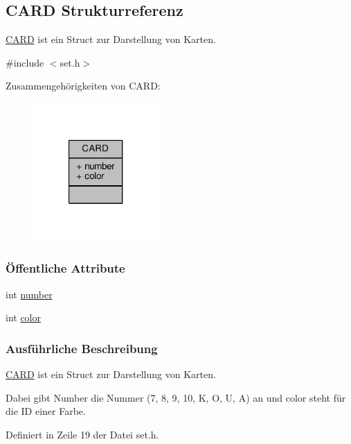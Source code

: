 \hypertarget{struct_c_a_r_d}{\subsection{C\-A\-R\-D Strukturreferenz}
\label{struct_c_a_r_d}
}


\hyperlink{struct_c_a_r_d}{C\-A\-R\-D} ist ein Struct zur Darstellung von Karten.  




{\ttfamily \#include $<$set.\-h$>$}



Zusammengehörigkeiten von C\-A\-R\-D\-:\nopagebreak
\begin{figure}[H]
\begin{center}
\leavevmode
\includegraphics[width=136pt]{d8/ded/struct_c_a_r_d__coll__graph}
\end{center}
\end{figure}
\subsubsection*{Öffentliche Attribute}
\begin{DoxyCompactItemize}
\item 
int \hyperlink{struct_c_a_r_d_a36f0e6c29177b3e38a73a17c57d2f0ac}{number}
\item 
int \hyperlink{struct_c_a_r_d_a931664b6380e876a72b664225ddfe20d}{color}
\end{DoxyCompactItemize}


\subsubsection{Ausführliche Beschreibung}
\hyperlink{struct_c_a_r_d}{C\-A\-R\-D} ist ein Struct zur Darstellung von Karten. 

Dabei gibt Number die Nummer (7, 8, 9, 10, K, O, U, A) an und color steht für die I\-D einer Farbe. 

Definiert in Zeile 19 der Datei set.\-h.




